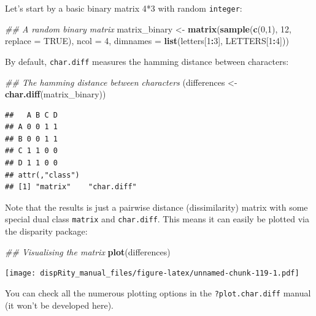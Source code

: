 \documentclass[]{book}
\newenvironment{Shaded}{\begin{snugshade}}{\end{snugshade}}
\newcommand{\CommentTok}[1]{\textcolor[rgb]{0.56,0.35,0.01}{\textit{#1}}}
\newcommand{\DataTypeTok}[1]{\textcolor[rgb]{0.13,0.29,0.53}{#1}}
\newcommand{\DecValTok}[1]{\textcolor[rgb]{0.00,0.00,0.81}{#1}}
\newcommand{\KeywordTok}[1]{\textcolor[rgb]{0.13,0.29,0.53}{\textbf{#1}}}
\newcommand{\NormalTok}[1]{#1}
\newcommand{\OperatorTok}[1]{\textcolor[rgb]{0.81,0.36,0.00}{\textbf{#1}}}
\newcommand{\OtherTok}[1]{\textcolor[rgb]{0.56,0.35,0.01}{#1}}
\newcommand{\StringTok}[1]{\textcolor[rgb]{0.31,0.60,0.02}{#1}}
\begin{document}
Let's start by a basic binary matrix 4*3 with random \texttt{integer}:

\begin{Shaded}
\begin{Highlighting}[]
\CommentTok{## A random binary matrix}
\NormalTok{matrix_binary <-}\StringTok{ }\KeywordTok{matrix}\NormalTok{(}\KeywordTok{sample}\NormalTok{(}\KeywordTok{c}\NormalTok{(}\DecValTok{0}\NormalTok{,}\DecValTok{1}\NormalTok{), }\DecValTok{12}\NormalTok{, }\DataTypeTok{replace =} \OtherTok{TRUE}\NormalTok{), }\DataTypeTok{ncol =} \DecValTok{4}\NormalTok{,}
                        \DataTypeTok{dimnames =} \KeywordTok{list}\NormalTok{(letters[}\DecValTok{1}\OperatorTok{:}\DecValTok{3}\NormalTok{], LETTERS[}\DecValTok{1}\OperatorTok{:}\DecValTok{4}\NormalTok{]))}
\end{Highlighting}
\end{Shaded}

By default, \texttt{char.diff} measures the hamming distance between characters:

\begin{Shaded}
\begin{Highlighting}[]
\CommentTok{## The hamming distance between characters}
\NormalTok{(differences <-}\StringTok{ }\KeywordTok{char.diff}\NormalTok{(matrix_binary))}
\end{Highlighting}
\end{Shaded}

\begin{verbatim}
##   A B C D
## A 0 0 1 1
## B 0 0 1 1
## C 1 1 0 0
## D 1 1 0 0
## attr(,"class")
## [1] "matrix"    "char.diff"
\end{verbatim}

Note that the results is just a pairwise distance (dissimilarity) matrix with some special dual class \texttt{matrix} and \texttt{char.diff}.
This means it can easily be plotted via the disparity package:

\begin{Shaded}
\begin{Highlighting}[]
\CommentTok{## Visualising the matrix}
\KeywordTok{plot}\NormalTok{(differences)}
\end{Highlighting}
\end{Shaded}

\texttt{[image: dispRity\_manual\_files/figure-latex/unnamed-chunk-119-1.pdf]}

You can check all the numerous plotting options in the \texttt{?plot.char.diff} manual (it won't be developed here).
\end{document}
